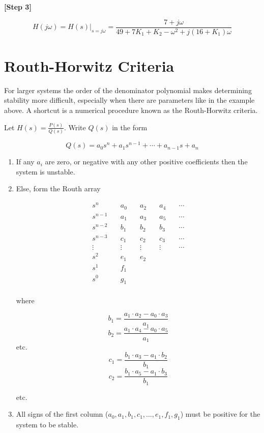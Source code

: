 \documentclass{article}
\begin{document}
\textbf{[Step 3]}

\[
H(j\omega) = \left. H(s)\right|_{s=j \omega} = \frac{7+j\omega}{49+7K_1 + K_2 - \omega^2 + j(16 + K_1)\omega}
\]

\section{Routh-Horwitz Criteria}

For larger systems the order of the denominator polynomial makes determining stability more difficult, especially when there are parameters like in the example above. A shortcut is a numerical procedure known as the Routh-Horwitz criteria.

Let $H(s) = \frac{P(s)}{Q(s)}$. Write $Q(s)$ in the form

\[
Q(s) = a_0s^n + a_1s^{n-1} + \cdots + a_{n-1}s + a_n
\]

\begin{enumerate}
\item If any $a_i$ are zero, or negative with any other positive coefficients then the system is unstable.
\item Else, form the Routh array

  \begin{align*}
    s^n &\quad a_0 &\quad a_2 &\quad a_4 &\quad \cdots\\
    s^{n-1} &\quad a_1 &\quad a_3 &\quad a_5 &\quad \cdots\\
    s^{n-2} &\quad b_1 &\quad b_2 &\quad b_3 &\quad \cdots\\
    s^{n-3} &\quad c_1 &\quad c_2 &\quad c_3 &\quad \cdots\\
    \vdots &\quad \vdots &\quad \vdots &\quad \vdots &\quad \cdots\\
    s^2 &\quad e_1 &\quad e_2 &\quad  &\quad \\
    s^1 &\quad f_1 &\quad  &\quad  &\quad \\
    s^0 &\quad g_1 &\quad  &\quad  &\quad \\
  \end{align*}

  where

  \[
  b_1 = \frac{a_1\cdot a_2 - a_0\cdot a_3}{a_1}
  \]
  \[
  b_2 = \frac{a_1\cdot a_4 - a_0\cdot a_5}{a_1}
  \]
  etc.
  \[
  c_1 = \frac{b_1\cdot a_3 - a_1\cdot b_2}{b_1}
  \]
  \[
  c_2 = \frac{b_1\cdot a_5 - a_1\cdot b_3}{b_1}
  \]

  etc.

\item All signs of the first column ($a_0, a_1, b_1, c_1,\ldots, e_1, f_1,g_1$) must be positive for the system to be stable.
\end{enumerate}
\end{document}

